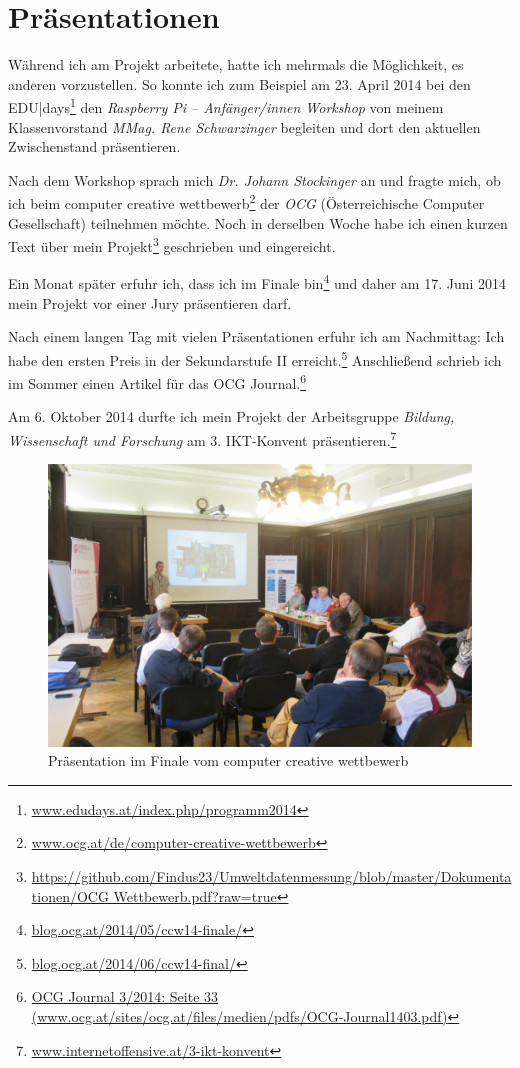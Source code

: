 \chapter{Präsentationen}
\label{anhang:präsentationen}

Während ich am Projekt arbeitete, hatte ich mehrmals die Möglichkeit, es anderen vorzustellen. 
So konnte ich zum Beispiel am 23. April 2014 bei den \textsf{EDU|days}\footnote{\href{http://www.edudays.at/index.php/programm2014}{www.edudays.at/index.php/programm2014}} den \emph{Raspberry Pi -- Anfänger/innen Workshop} von meinem Klassenvorstand \emph{MMag. Rene Schwarzinger} begleiten und dort den aktuellen Zwischenstand präsentieren. 

Nach dem Workshop sprach mich \emph{Dr. Johann Stockinger} an und fragte mich, ob ich beim \textsf{computer creative wettbewerb}\footnote{\href{http://www.ocg.at/de/computer-creative-wettbewerb}{www.ocg.at/de/computer-creative-wettbewerb}} der \emph{OCG} (Österreichische Computer Gesellschaft)
teilnehmen möchte. Noch in derselben Woche habe ich einen kurzen Text über mein Projekt\footnote{\href{https://github.com/Findus23/Umweltdatenmessung/blob/master/Dokumentationen/OCG Wettbewerb.pdf?raw=true}{https://github.com/Findus23/Umweltdatenmessung/blob/master/Dokumentationen/OCG Wettbewerb.pdf?raw=true}}
geschrieben und eingereicht.

Ein Monat später erfuhr ich, dass ich im Finale bin\footnote{\href{http://blog.ocg.at/2014/05/ccw14-finale/}{blog.ocg.at/2014/05/ccw14-finale/}} und daher am 17. Juni 2014 mein Projekt vor einer Jury präsentieren darf. 

Nach einem langen Tag mit vielen Präsentationen erfuhr ich am Nachmittag: Ich habe den ersten Preis in der Sekundarstufe II erreicht.\footnote{\href{http://blog.ocg.at/2014/06/ccw14-final/}{blog.ocg.at/2014/06/ccw14-final/}}
Anschließend schrieb ich im Sommer einen Artikel für das OCG Journal.\footnote{\href{http://www.ocg.at/sites/ocg.at/files/medien/pdfs/OCG-Journal1403.pdf}{OCG Journal 3/2014: Seite 33 (www.ocg.at/sites/ocg.at/files/medien/pdfs/OCG-Journal1403.pdf)}}

Am 6. Oktober 2014 durfte ich mein Projekt der Arbeitsgruppe \textit{Bildung, Wissenschaft und Forschung} am \textsf{3. IKT-Konvent} präsentieren.\footnote{\href{http://www.internetoffensive.at/3-ikt-konvent}{www.internetoffensive.at/3-ikt-konvent}}

\begin{figure}[h]
	\centering
	\includegraphics[width=\textwidth]{figures/ocg.jpg}
	\caption{Präsentation im Finale vom \textsf{computer creative wettbewerb}}
\end{figure}	


